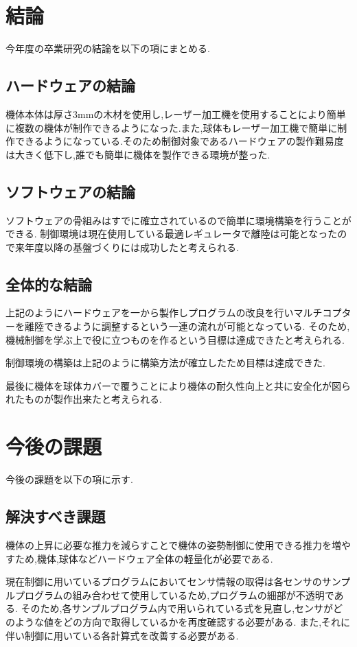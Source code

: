 \documentclass[12pt,oneside]{sotsuken_paper}
\begin{document}
\section{結論}
今年度の卒業研究の結論を以下の項にまとめる.

\subsection{ハードウェアの結論}
機体本体は厚さ3mmの木材を使用し,レーザー加工機を使用することにより簡単に複数の機体が制作できるようになった.また,球体もレーザー加工機で簡単に制作できるようになっている.そのため制御対象であるハードウェアの製作難易度は大きく低下し,誰でも簡単に機体を製作できる環境が整った.

\subsection{ソフトウェアの結論}
ソフトウェアの骨組みはすでに確立されているので簡単に環境構築を行うことができる.
制御環境は現在使用している最適レギュレータで離陸は可能となったので来年度以降の基盤づくりには成功したと考えられる.

\subsection{全体的な結論}
上記のようにハードウェアを一から製作しプログラムの改良を行いマルチコプターを離陸できるように調整するという一連の流れが可能となっている.
そのため,機械制御を学ぶ上で役に立つものを作るという目標は達成できたと考えられる.


制御環境の構築は上記のように構築方法が確立したため目標は達成できた.


最後に機体を球体カバーで覆うことにより機体の耐久性向上と共に安全化が図られたものが製作出来たと考えられる.

\section{今後の課題}
今後の課題を以下の項に示す.

\subsection{解決すべき課題}
機体の上昇に必要な推力を減らすことで機体の姿勢制御に使用できる推力を増やすため,機体,球体などハードウェア全体の軽量化が必要である.


現在制御に用いているプログラムにおいてセンサ情報の取得は各センサのサンプルプログラムの組み合わせて使用しているため,プログラムの細部が不透明である.
そのため,各サンプルプログラム内で用いられている式を見直し,センサがどのような値をどの方向で取得しているかを再度確認する必要がある.
また,それに伴い制御に用いている各計算式を改善する必要がある.
\end{document}

